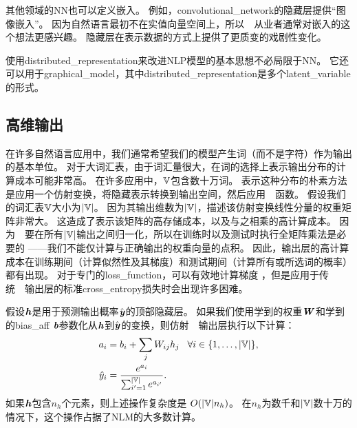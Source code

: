 其他领域的\gls{NN}也可以定义嵌入。
例如，\gls{convolutional_network}的隐藏层提供``图像嵌入''。
因为自然语言最初不在实值向量空间上，所以~~从业者通常对嵌入的这个想法更感兴趣。
隐藏层在表示数据的方式上提供了更质变的戏剧性变化。


使用\gls{distributed_representation}来改进\gls{NLP}模型的基本思想不必局限于\gls{NN}。
它还可以用于\gls{graphical_model}，其中\gls{distributed_representation}是多个\gls{latent_variable}的形式。

\subsection{高维输出}
\label{sec:high_dimensional_outputs}

在许多自然语言应用中，我们通常希望我们的模型产生词（而不是字符）作为输出的基本单位。
对于大词汇表，由于词汇量很大，在词的选择上表示输出分布的计算成本可能非常高。
在许多应用中，$\mathbb{V}$包含数十万词。
表示这种分布的朴素方法是应用一个仿射变换，将隐藏表示转换到输出空间，然后应用~~函数。
假设我们的词汇表$\mathbb{V}$大小为$| \mathbb{V} |$。
因为其输出维数为$| \mathbb{V} |$，描述该仿射变换线性分量的权重矩阵非常大。
这造成了表示该矩阵的高存储成本，以及与之相乘的高计算成本。
因为~~要在所有$| \mathbb{V} |$输出之间归一化，所以在训练时以及测试时执行全矩阵乘法是必要的 ——我们不能仅计算与正确输出的权重向量的点积。
因此，输出层的高计算成本在训练期间（计算似然性及其梯度）和测试期间（计算所有或所选词的概率）都有出现。
对于专门的\gls{loss_function}，可以有效地计算梯度 \citep{Vincent2015}，但是应用于传统~~输出层的标准\gls{cross_entropy}损失时会出现许多困难。

假设$\boldsymbol{\mathit{h}}$是用于预测输出概率$\hat {\boldsymbol{\mathit{y}}}$的顶部隐藏层。
如果我们使用学到的权重$\boldsymbol{\mathit{W}}$和学到的\gls{bias_aff} $\boldsymbol{\mathit{b}}$参数化从$\boldsymbol{\mathit{h}}$到$\hat {\boldsymbol{\mathit{y}}}$的变换，则仿射~~输出层执行以下计算：
\begin{align}
\label{eq:softmax-over-words}
  a_i &= b_i + \sum_j  W_{ij} h_j \;\;\; \forall i \in \{1,\ldots,|\mathbb{V}|\}, \\
  \hat{y}_i &= \frac{e^{a_i}}{\sum_{i'=1}^{|\mathbb{V}|} e^{a_{i'}}}.
\end{align}
如果$\boldsymbol{\mathit{h}}$包含$n_h$个元素，则上述操作复杂度是 $O(|\mathbb{V}| n_h)$。
在$n_h$为数千和$| \mathbb{V} |$数十万的情况下，这个操作占据了\gls{NLM}的大多数计算。


